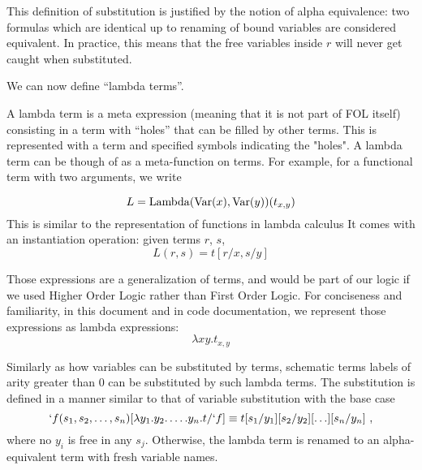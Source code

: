 This definition of substitution is justified by the notion of alpha equivalence: two formulas which are identical up to renaming of bound variables are considered equivalent. In practice, this means that the free variables inside $r$ will never get caught when substituted.

We can now define \enquote{lambda terms}.
\begin{defin}
  A lambda term is a  meta expression (meaning that it is not part of FOL itself) consisting in a term with ``holes'' that can be filled by other terms. This is represented with a term and specified symbols indicating the "holes". 
  A lambda term can be though of as a meta-function on terms. For example, for a functional term with two arguments, we write

  $$
    L = \operatorname{Lambda}(\operatorname{Var}(x), \operatorname{Var}(y))(t_{x,y})
  $$
  This is similar to the representation of functions in lambda calculus
  It comes with an instantiation operation: given terms $r$, $s$,
  $$L(r, s) = t[r/x, s/y]$$
\end{defin}
Those expressions are a generalization of terms, and would be part of our logic if we used Higher Order Logic rather than First Order Logic. For conciseness and familiarity, in this document and in code documentation, we represent those expressions as lambda expressions:
 $$\lambda x y. t_{x,y}$$

Similarly as how variables can be substituted by terms, schematic terms labels of arity greater than 0 can be substituted by such lambda terms.
The substitution is defined in a manner similar to that of variable substitution with the base case
%
\begin{equation*}
  `f(s_1, s_2, \ldots, s_n)[\lambda y_1.y_2.\ldots.y_n. t/`f] \equiv t[s_1/y_1][s_2/y_2][\ldots][s_n/y_n]~,
\end{equation*}
%
where no $y_i$ is free in any $s_j$. Otherwise, the lambda term is renamed to an alpha-equivalent term with fresh variable names.

